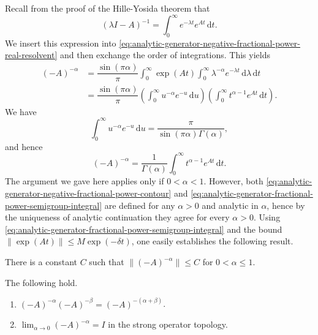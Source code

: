 Recall from the proof of the Hille-Yosida theorem that
\begin{equation}\label{eq:fractional-power-resolvent-laplace-formula}
(\lambda I-A)^{-1}=\int_0^\infty e^{-\lambda t}e^{At}\,\mathrm{d}t.
\end{equation}
We insert this expression into \eqref{eq:analytic-generator-negative-fractional-power-real-resolvent} and then exchange the order of integrations. This yields\[\begin{aligned}
(-A)^{-\alpha}&=\dfrac{\sin(\pi\alpha)}{\pi}\int_0^\infty\exp(At)\int_0^\infty\lambda^{-\alpha}e^{-\lambda t}\,\mathrm{d}\lambda\,\mathrm{d}t\\
&=\dfrac{\sin(\pi\alpha)}{\pi}\left(\int_0^\infty u^{-\alpha}e^{-u}\,\mathrm{d}u\right)\left(\int_0^\infty t^{\alpha-1}e^{At}\,\mathrm{d}t\right).
\end{aligned}\]We have
\begin{equation}\label{eq:fractional-power-gamma-reflection-integral}
\int_0^\infty u^{-\alpha}e^{-u}\,\mathrm{d}u=\dfrac{\pi}{\sin(\pi\alpha)\Gamma(\alpha)},
\end{equation}
and hence
\begin{equation}\label{eq:analytic-generator-fractional-power-semigroup-integral}
(-A)^{-\alpha}=\dfrac{1}{\Gamma(\alpha)}\int_0^\infty t^{\alpha-1}e^{At}\,\mathrm{d}t.
\end{equation}
The argument we gave here applies only if $0<\alpha<1$. However, both \eqref{eq:analytic-generator-negative-fractional-power-contour} and \eqref{eq:analytic-generator-fractional-power-semigroup-integral} are defined for any $\alpha>0$ and analytic in $\alpha$, hence by the uniqueness of analytic continuation they agree for every $\alpha>0$. Using \eqref{eq:analytic-generator-fractional-power-semigroup-integral} and the bound $\|\exp(At)\|\leq M\exp(-\delta t)$, one easily establishes the following result.

\begin{Lemma}
\label{lem:negative-fractional-power-uniform-bound}
There is a constant $C$ such that $\|(-A)^{-\alpha}\|\leq C$ for $0<\alpha\leq1$.
\end{Lemma}

\begin{Theorem}
\label{thm:negative-fractional-powers-semigroup}
The following hold.\begin{enumerate}\item $(-A)^{-\alpha}(-A)^{-\beta}=(-A)^{-(\alpha+\beta)}$.\item $\lim_{\alpha\to0}(-A)^{-\alpha}=I$ in the strong operator topology.\end{enumerate}
\end{Theorem}

